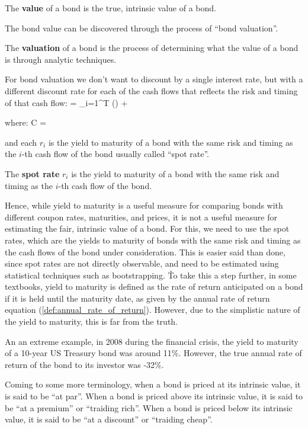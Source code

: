 The \textbf{value} of a bond is the true, intrinsic value of a bond.
\ed

The bond value can be discovered through the process of ``bond valuation''.

The \textbf{valuation} of a bond is the process of determining what the value of a bond is through analytic techniques.
\ed

For bond valuation we don't want to discount by a single interest rate, but with a different discount rate for each of
the cash flows that reflects the risk and timing of that cash flow:
\bse
{} = \sum_{i=1}^T \Bigg(\Bigg) +
\ese

where:
\bse
C = 
\ese

and each $r_i$ is the yield to maturity of a bond with the same risk and timing as the $i$-th cash flow of the bond
usually called ``spot rate''.

The \textbf{spot rate} $r_i$ is the yield to maturity of a bond with the same risk and timing as the $i$-th cash flow
of the bond.
\ed

Hence, while yield to maturity is a useful measure for comparing bonds with different coupon rates, maturities, and
prices, it is not a useful measure for estimating the fair, intrinsic value of a bond. For this, we need to use the
spot rates, which are the yields to maturity of bonds with the same risk and timing as the cash flows of the bond
under consideration. This is easier said than done, since spot rates are not directly observable, and need to be
estimated using statistical techniques such as bootstrapping. \v

To take this a step further, in some textbooks, yield to maturity is defined as the rate of return anticipated on a bond
if it is held until the maturity date, as given by the annual rate of return equation (\ref{def:annual_rate_of_return}).
However, due to the simplistic nature of the yield to maturity, this is far from the truth.

\be
An an extreme example, in 2008 during the financial crisis, the yield to maturity of a 10-year US Treasury bond was
around 11\%. However, the true annual rate of return of the bond to its investor was -32\%.
\ee

Coming to some more terminology, when a bond is priced at its intrinsic value, it is said to be ``at par''. When a
bond is priced above its intrinsic value, it is said to be ``at a premium'' or ``traiding rich''. When a bond is
priced below its intrinsic value, it is said to be ``at a discount'' or ``traiding cheap''.

